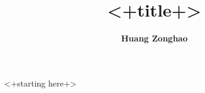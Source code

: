 \documentclass[12pt, letter]{article}
\begin{document}
\title{\textbf {<+title+>}}
\author{\textbf{Huang Zonghao}}
\maketitle
<+starting here+>

\end{document}
